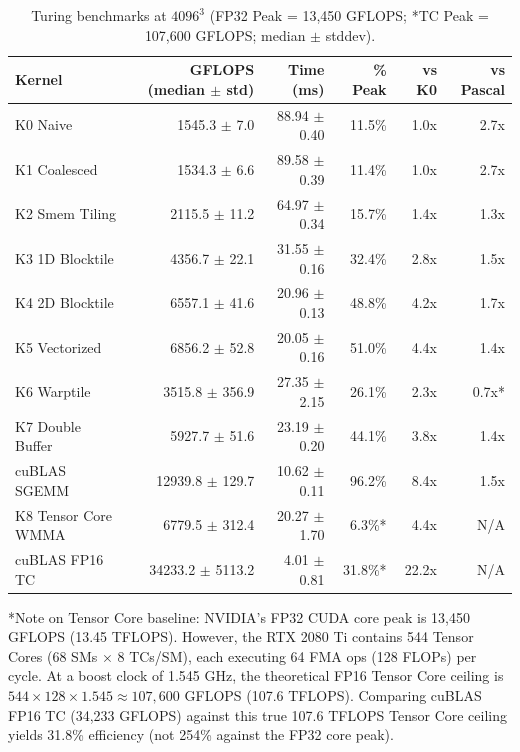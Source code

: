 \documentclass[11pt]{article}
\begin{document}
\begin{table}[h]
\centering
\begin{tabular}{|l|r|r|r|r|r|}
\hline
\textbf{Kernel} & \textbf{GFLOPS (median $\pm$ std)} & \textbf{Time (ms)} & \textbf{\% Peak} & \textbf{vs K0} & \textbf{vs Pascal} \\
\hline
K0 Naive & 1545.3 $\pm$ 7.0 & 88.94 $\pm$ 0.40 & 11.5\% & 1.0x & 2.7x \\
K1 Coalesced & 1534.3 $\pm$ 6.6 & 89.58 $\pm$ 0.39 & 11.4\% & 1.0x & 2.7x \\
K2 Smem Tiling & 2115.5 $\pm$ 11.2 & 64.97 $\pm$ 0.34 & 15.7\% & 1.4x & 1.3x \\
K3 1D Blocktile & 4356.7 $\pm$ 22.1 & 31.55 $\pm$ 0.16 & 32.4\% & 2.8x & 1.5x \\
K4 2D Blocktile & 6557.1 $\pm$ 41.6 & 20.96 $\pm$ 0.13 & 48.8\% & 4.2x & 1.7x \\
K5 Vectorized & 6856.2 $\pm$ 52.8 & 20.05 $\pm$ 0.16 & 51.0\% & 4.4x & 1.4x \\
K6 Warptile & 3515.8 $\pm$ 356.9 & 27.35 $\pm$ 2.15 & 26.1\% & 2.3x & 0.7x* \\
K7 Double Buffer & 5927.7 $\pm$ 51.6 & 23.19 $\pm$ 0.20 & 44.1\% & 3.8x & 1.4x \\
cuBLAS SGEMM & 12939.8 $\pm$ 129.7 & 10.62 $\pm$ 0.11 & 96.2\% & 8.4x & 1.5x \\
K8 Tensor Core WMMA & 6779.5 $\pm$ 312.4 & 20.27 $\pm$ 1.70 & 6.3\%* & 4.4x & N/A \\
cuBLAS FP16 TC & 34233.2 $\pm$ 5113.2 & 4.01 $\pm$ 0.81 & 31.8\%* & 22.2x & N/A \\
\hline
\end{tabular}
\caption{Turing benchmarks at $4096^3$ (FP32 Peak = 13,450 GFLOPS; *TC Peak = 107,600 GFLOPS; median $\pm$ stddev).}
\end{table}

*Note on Tensor Core baseline: NVIDIA's FP32 CUDA core peak is 13,450 GFLOPS (13.45 TFLOPS). However, the RTX 2080 Ti contains 544 Tensor Cores (68 SMs $\times$ 8 TCs/SM), each executing 64 FMA ops (128 FLOPs) per cycle. At a boost clock of 1.545 GHz, the theoretical FP16 Tensor Core ceiling is $544 \times 128 \times 1.545 \approx 107{,}600$ GFLOPS (107.6 TFLOPS). Comparing cuBLAS FP16 TC (34,233 GFLOPS) against this true 107.6 TFLOPS Tensor Core ceiling yields 31.8\% efficiency (not 254\% against the FP32 core peak).
\end{document}
